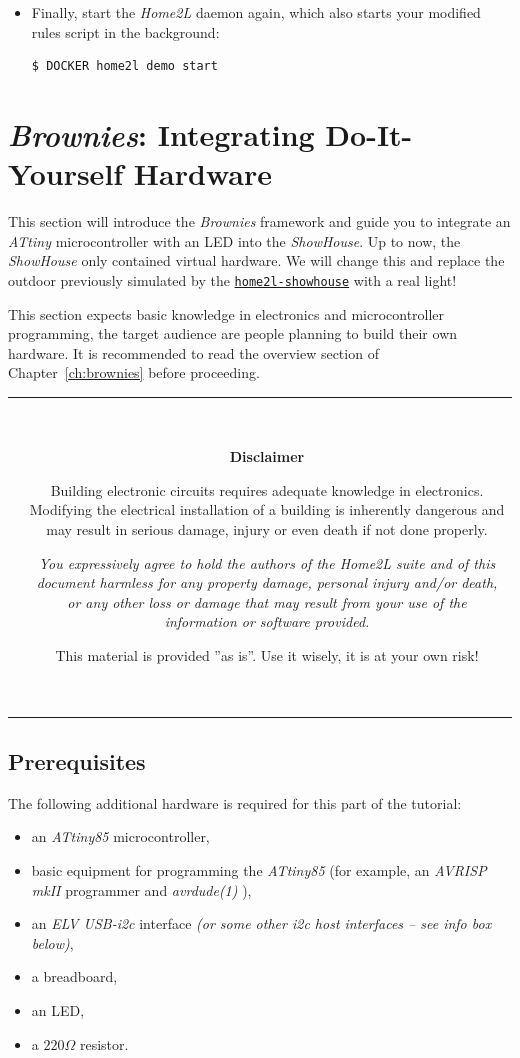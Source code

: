 \documentclass[12pt,english,parskip=half,headheight=19pt]{scrreprt}
\newcommand{\warnbox}[1]{
  \par
  \medskip
  \hfill
  \setlength\arrayrulewidth{1pt}
  \begin{tabular}[b]{c|c|}
    
    &
    \,\parbox{0.89\linewidth}{\setlength{\parskip}{0.5em}#1}\,
  \end{tabular}
  \medskip
  \par
}
\newcommand{\eshockdisclaimer}{
  \warnbox{\textbf{Disclaimer}

    Building electronic circuits requires adequate knowledge in electronics.
    Modifying the electrical installation of a building is inherently dangerous and may result in
    serious damage, injury or even death if not done properly.

    \textit{You expressively agree to hold the authors of the \textit{Home2L} suite and of this
    document harmless for any property damage, personal injury and/or death, or any other loss or
    damage that may result from your use of the information or software provided.}

    This material is provided ''as is''. Use it wisely, it is at your own risk!
  }
}
\newcommand{\idx}[1]{#1\index{#1}}
\newcommand{\reftool}[1]{\hyperref[tool:#1]{\texttt{\idx{#1}}}}
\begin{document}
\begin{itemize}[$\blacktriangleright$]

\item
  Finally, start the \textit{Home2L} daemon again, which also starts your modified rules script
  in the background:
  \begin{lstlisting}[language=bash]
    $ DOCKER home2l demo start
  \end{lstlisting}

\end{itemize}





\clearpage
\section{\textit{Brownies}: Integrating Do-It-Yourself Hardware}
\label{sec:tutorial-brownies}


This section will introduce the \textit{Brownies} framework and guide you to integrate an \textit{ATtiny} microcontroller with an LED into the \textit{ShowHouse}. Up to now, the \textit{ShowHouse} only contained virtual hardware. We will change this and replace the outdoor previously simulated by the \reftool{home2l-showhouse} with a real light!

This section expects basic knowledge in electronics and microcontroller programming, the target audience are people planning  to build their own hardware. It is recommended to read the overview section of Chapter~\ref{ch:brownies} before proceeding.

\eshockdisclaimer



\subsection{Prerequisites}
\label{sec:tutorial-brownies-prerequisites}

The following additional hardware is required for this part of the tutorial:
\begin{itemize}
  \item an \textit{ATtiny85} microcontroller,
  \item basic equipment for programming the \textit{ATtiny85}
        (for example, an \textit{AVRISP mkII} programmer and \textit{avrdude(1)} ),
  \item an \textit{ELV USB-i2c} interface
        \textit{(or some other \textit{i2c} host interfaces -- see info box below)},
  \item a breadboard,
  \item an LED,
  \item a $220\Omega$ resistor.
\end{itemize}
\end{document}
